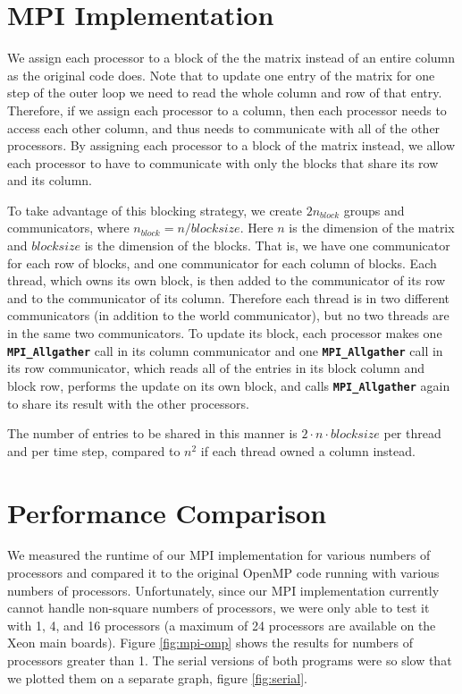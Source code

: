 \documentclass[11pt]{article}
\begin{document}
\section{MPI Implementation}
We assign each processor to a block of the the matrix instead of an entire column as the original code does.
Note that to update one entry of the matrix for one step of the outer loop we need to read the whole column and row of that entry. Therefore, if we assign each processor to a column, then each processor needs to access each other column, and thus needs to communicate with all of the other processors. By assigning each processor to a block of the matrix instead, we allow each processor to have to communicate with only the blocks that share its row and its column.

To take advantage of this blocking strategy, we create $2n_{block}$ groups and communicators, where $n_{block}=n/blocksize$. Here $n$  is the dimension of the matrix and $blocksize$ is the dimension of the blocks. That is, we have one communicator for each row of blocks, and one communicator for each column of blocks. Each thread, which owns its own block, is then added to the communicator of its row and to the communicator of its column. Therefore each thread is in two different communicators (in addition to the world communicator), but no two threads are in the same two communicators. To update its block, each processor makes one \textbf{\texttt{MPI\_Allgather}} call in its column communicator and one \textbf{ \texttt{MPI\_Allgather}} call in its row communicator, which reads all of the entries in its block column and block row, performs the update on its own block, and calls \textbf{\texttt{MPI\_Allgather}} again to share its result with the other processors.

The number of entries to be shared in this manner is $2 \cdot n \cdot blocksize$ per thread and per time step, compared to $n^2$ if each thread owned a column instead.

\section{Performance Comparison}
We measured the runtime of our MPI implementation for various numbers of processors and compared it to the original OpenMP code running with various numbers of processors.
Unfortunately, since our MPI implementation currently cannot handle non-square numbers of processors, we were only able to test it with 1, 4, and 16 processors (a maximum of 24 processors are available on the Xeon main boards).
Figure \ref{fig:mpi-omp} shows the results for numbers of processors greater than 1.
The serial versions of both programs were so slow that we plotted them on a separate graph, figure \ref{fig:serial}.
\end{document}
